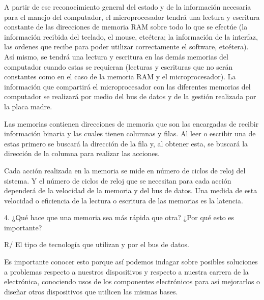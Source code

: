 \documentclass{article}
\begin{document}
A partir de ese reconocimiento general del estado y de la información necesaria para el manejo del computador, el microprocesador tendrá una lectura y escritura constante de las direcciones de memoria RAM sobre todo lo que se efectúe (la información recibida del teclado, el mouse, etcétera; la información de la interfaz, las ordenes que recibe para poder utilizar correctamente el software, etcétera). Así mismo, se tendrá una lectura y escritura en las demás memorias del computador cuando estas se requieran (lecturas y escrituras que no serán constantes como en el caso de la memoria RAM y el microprocesador). La información que compartirá el microprocesador con las diferentes memorias del computador se realizará por medio del bus de datos y de la gestión realizada por la placa madre.

Las memorias contienen direcciones de memoria que son las encargadas de recibir información binaria y las cuales tienen columnas y filas. Al leer o escribir una de estas primero se buscará la dirección de la fila y, al obtener esta, se buscará la dirección de la columna para realizar las acciones.

Cada acción realizada en la memoria se mide en número de ciclos de reloj del sistema. Y el número de ciclos de reloj que se necesitan para cada acción dependerá de la velocidad de la memoria y del bus de datos. Una medida de esta velocidad o eficiencia de la lectura o escritura de las memorias es la latencia.


\vspace{0.5cm}
4. ¿Qué hace que una memoria sea más rápida que otra? ¿Por qué esto es importante?

R/ El tipo de tecnología que utilizan y por el bus de datos.

Es importante conocer esto porque así podemos indagar sobre posibles soluciones a problemas respecto a nuestros dispositivos  y respecto a nuestra carrera de la electrónica, conociendo usos de los componentes electrónicos para así mejorarlos o diseñar otros dispositivos que utilicen las mismas bases.



\vspace{0.5cm}



\end{document}
